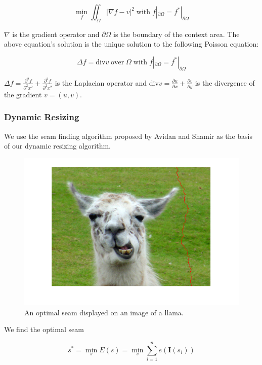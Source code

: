 \documentclass[11pt]{amsart}
\begin{document}
$$ 
\min_f \iint_\Omega|\nabla f-v|^{2} \;\mathrm{with}\; f|_{\partial\Omega} = f^{\ast}|_{\partial\Omega} 
$$

$\nabla$ is the gradient operator and $\partial\Omega$ is the boundary of the context area. The above equation's solution is the unique solution to the following Poisson equation:

$$
\Delta f=\mathrm{div} v\;\mathrm{ over }\;\Omega\;\mathrm{  with}\;  f|_{\partial\Omega} = f^{\ast}|_{\partial\Omega}
$$

$\Delta f = \frac{\partial^{2} f}{\partial^{2}x^2}+\frac{\partial^{2}f}{\partial^{2}x^2}$ is the Laplacian operator and $\mathrm{div} v = \frac{\partial u}{\partial x}+\frac{\partial v}{\partial y}$ is the divergence of the gradient $v=(u,v)$.


\subsubsection{Dynamic Resizing}

We use the seam finding algorithm proposed by Avidan and Shamir \cite{Avidan:2007} as the basis of our dynamic resizing algorithm. 

\begin{figure}[htbp]
\begin{center}
\includegraphics[scale=.38]{seam.png}
\caption{An optimal seam displayed on an image of a llama.}
\label{llamaSeam}
\end{center}
\end{figure}


We find the optimal seam  

$$ 
s^* = \min_s E(s) = \min_s \sum^n_{i=1} e(\mathbf{I}(s_i))
$$
\end{document}
